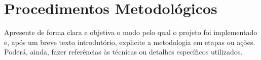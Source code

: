 \chapter{Procedimentos Metodol\'ogicos}
\label{cap:metodologia}

Apresente de forma clara e objetiva o modo pelo qual o projeto foi
implementado e, ap\'os um breve texto introdut\'orio, explicite a
metodologia em etapas ou a\c{c}\~oes. Poder\'a, ainda, fazer refer\^encias
\`as t\'ecnicas ou detalhes espec\'ificos utilizados.
